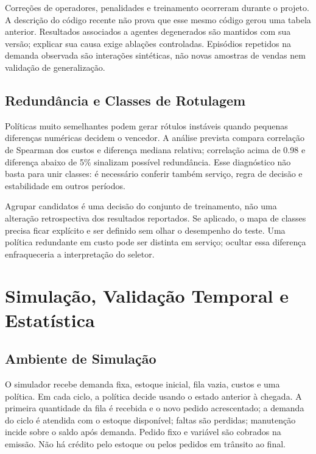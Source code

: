 Correções de operadores, penalidades e treinamento ocorreram durante o projeto. A descrição do código recente não prova que esse mesmo código gerou uma tabela anterior. Resultados associados a agentes degenerados são mantidos com sua versão; explicar sua causa exige ablações controladas. Episódios repetidos na demanda observada são interações sintéticas, não novas amostras de vendas nem validação de generalização.

\subsection{Redundância e Classes de Rotulagem}
\label{sec:redundancia_portfolio}

Políticas muito semelhantes podem gerar rótulos instáveis quando pequenas diferenças numéricas decidem o vencedor. A análise prevista compara correlação de Spearman dos custos e diferença mediana relativa; correlação acima de 0.98 e diferença abaixo de 5\% sinalizam possível redundância. Esse diagnóstico não basta para unir classes: é necessário conferir também serviço, regra de decisão e estabilidade em outros períodos.

Agrupar candidatos é uma decisão do conjunto de treinamento, não uma alteração retrospectiva dos resultados reportados. Se aplicado, o mapa de classes precisa ficar explícito e ser definido sem olhar o desempenho do teste. Uma política redundante em custo pode ser distinta em serviço; ocultar essa diferença enfraqueceria a interpretação do seletor.

\section{Simulação, Validação Temporal e Estatística}
\label{sec:simulacao_benchmark}
\subsection{Ambiente de Simulação}
\label{sec:ambiente_simulacao}

O simulador recebe demanda fixa, estoque inicial, fila vazia, custos e uma política. Em cada ciclo, a política decide usando o estado anterior à chegada. A primeira quantidade da fila é recebida e o novo pedido acrescentado; a demanda do ciclo é atendida com o estoque disponível; faltas são perdidas; manutenção incide sobre o saldo após demanda. Pedido fixo e variável são cobrados na emissão. Não há crédito pelo estoque ou pelos pedidos em trânsito ao final.

